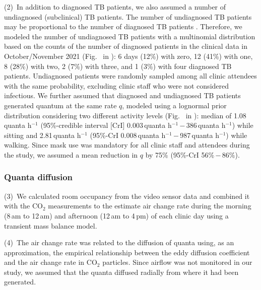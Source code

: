 \documentclass[fleqn,11pt]{wlscirep}
\begin{document}
(2)~In addition to diagnosed TB patients, we also assumed a number of undiagnosed (subclinical) TB patients. The number of undiagnosed TB patients may be proportional to the number of diagnosed TB patients \cite{Berhanu2023CID,Moyo2022LancetID,Patterson2024PNAS}. Therefore, we modeled the number of undiagnosed TB patients with a multinomial distribution based on the counts of the number of diagnosed patients in the clinical data in October/November 2021 (Fig.~ in \supp): 6 days (12\%) with zero, 12 (41\%) with one, 8 (28\%) with two, 2 (7\%) with three, and 1 (3\%) with four diagnosed TB patients. Undiagnosed patients were randomly sampled among all clinic attendees with the same probability, excluding clinic staff who were not considered infectious. We further assumed that diagnosed and undiagnosed TB patients generated quantum at the same rate $q$, modeled using a lognormal prior distribution considering two different activity levels (Fig.~ in \supp): median of 1.08\,quanta h$^{-1}$ (95\%-credible interval [CrI] 0.003\,quanta h$^{-1}$\,$-$\,386\,quanta h$^{-1}$) while sitting and 2.81\,quanta h$^{-1}$ (95\%-CrI 0.008\,quanta h$^{-1}$\,$-$\,987\,quanta h$^{-1}$) while walking\cite{Mikszewski2021GF,Buonanno2020EI,Banholzer2024PGPH}. Since mask use  was mandatory for all clinic staff and attendees during the study, we assumed a mean reduction in $q$ by 75\% (95\%-CrI 56\%\,$-$\,86\%)\cite{Dharmadhikari2012AJRCCM,McCreesh2021BMJGlobalHealth}.

\subsubsection*{Quanta diffusion}

(3)~We calculated  room occupancy from the video sensor data and combined it with the CO$_2$ measurements  to the estimate air change rate during the morning (8\,am to 12\,am) and afternoon (12\,am to 4\,pm) of each clinic day using a transient mass balance model\cite{Batterman2017IJERPH}. 

(4)~The air change rate was related to the diffusion of quanta using, as an approximation, the empirical relationship between the eddy diffusion coefficient and the air change rate in CO$_2$ particles\cite{Cheng2011EnvSciTech,Foat2020BE}. Since airflow was not monitored in our study, we assumed that the quanta diffused radially from where it had been generated. 
\end{document}
